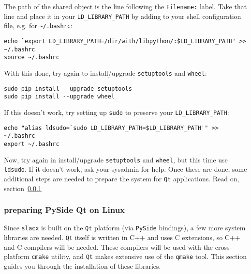 The path of the shared object is the line following the \verb|Filename:| label.
Take that line and place it in your \verb|LD_LIBRARY_PATH| 
by adding to your shell configuration file, 
e.g. for \verb|~/.bashrc|:
\begin{lstlisting}
echo `export LD_LIBRARY_PATH=/dir/with/libpython/:$LD_LIBRARY_PATH' >> ~/.bashrc
source ~/.bashrc
\end{lstlisting}

With this done, try again to install/upgrade \verb|setuptools| and \verb|wheel|:
\begin{lstlisting}
sudo pip install --upgrade setuptools 
sudo pip install --upgrade wheel 
\end{lstlisting}
If this doesn't work, try setting up \verb|sudo| to preserve your \verb|LD_LIBRARY_PATH|:
\begin{lstlisting}
echo "alias ldsudo=`sudo LD_LIBRARY_PATH=$LD_LIBRARY_PATH'" >> ~/.bashrc
export ~/.bashrc
\end{lstlisting}

Now, try again in install/upgrade \verb|setuptools| and \verb|wheel|,
but this time use \verb|ldsudo|.
If it doesn't work, ask your sysadmin for help.
Once these are done, some additional steps are needed
to prepare the system for \verb|Qt| applications.
Read on, section~\ref{subsubsec:pyside_linux}


\subsubsection{preparing PySide Qt on Linux}
\label{subsubsec:pyside_linux}

Since \verb|slacx| is built on the \verb|Qt| platform 
(via \verb|PySide| bindings),
a few more system libraries are needed.
\verb|Qt| itself is written in C++
and uses C extensions,
so C++ and C compilers will be needed.
These compilers will be used with the 
cross-platform \verb|cmake| utility,
and \verb|Qt| makes extensive use of the \verb|qmake| tool.
This section guides you through the installation of these libraries.

